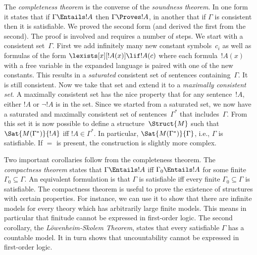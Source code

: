 The \emph{completeness theorem} is the converse of the \emph{soundness
  theorem}. In one form it states that if $\Gamma \Entails !A$ then
$\Gamma \Proves !A$, in another that if $\Gamma$ is consistent then it
is satisfiable. We proved the second form (and derived the first from
the second). The proof is involved and requires a number of steps. We
start with a consistent set~$\Gamma$.  First we add infinitely many
new constant symbols~$c_i$ as well as formulas of the form
$\lexists[x][!A(x)] \lif !A(c)$ where each formula~$!A(x)$ with a free
variable in the expanded language is paired with one of the new
constants. This results in a \emph{saturated} consistent set of
sentences containing~$\Gamma$. It is still consistent. Now we take
that set and extend it to a \emph{maximally consistent set}.  A
maximally consistent set has the nice property that for any
sentence~$!A$, either $!A$ or $\lnot !A$ is in the set. Since we started
from a saturated set, we now have a saturated and maximally consistent
set of sentences~$\Gamma^*$ that includes~$\Gamma$. From this set it
is now possible to define a structure~$\Struct{M}$ such that
$\Sat{M(\Gamma^*)}{!A}$ iff $!A \in \Gamma^*$. In particular,
$\Sat{M(\Gamma^*)}{\Gamma}$, i.e., $\Gamma$ is satisfiable.  If $=$ is
present, the construction is slightly more complex.

Two important corollaries follow from the completeness theorem. The
\emph{compactness theorem} states that $\Gamma \Entails !A$ iff
$\Gamma_0 \Entails !A$ for some finite $\Gamma_0 \subseteq \Gamma$. An
equivalent formulation is that $\Gamma$ is satisfiable iff every
finite $\Gamma_0 \subseteq \Gamma$ is satisfiable. The compactness
theorem is useful to prove the existence of structures with certain
properties. For instance, we can use it to show that there are
infinite models for every theory which has arbitrarily large finite
models.  This means in particular that finitude cannot be expressed in
first-order logic.  The second corollary, the \emph{L\"owenheim-Skolem
  Theorem}, states that every satisfiable $\Gamma$ has a countable
model. It in turn shows that uncountability cannot be expressed in
first-order logic.
